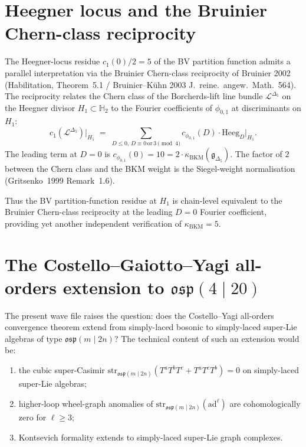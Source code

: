 \section*{Heegner locus and the Bruinier Chern-class reciprocity}

The Heegner-locus residue $c_1(0)/2 = 5$ of the BV partition function
admits a parallel interpretation via the Bruinier Chern-class
reciprocity of Bruinier 2002 (Habilitation, Theorem~5.1 /
Bruinier--Kühn 2003 J.~reine.~angew.~Math.~564). The reciprocity
relates the Chern class of the Borcherds-lift line bundle
$\mathcal{L}^{\Delta_5}$ on the Heegner divisor $H_1 \subset \mathbb{H}_2$
to the Fourier coefficients of $\phi_{0,1}$ at discriminants on $H_1$:
\begin{equation}
\label{eq:bruinier-chern-reciprocity}
 c_1(\mathcal{L}^{\Delta_5})\big|_{H_1}
 \;=\; \sum_{D \leq 0,\, D \equiv 0\, \mathrm{or}\, 3 \pmod 4}
 c_{\phi_{0,1}}(D) \cdot \mathrm{Heeg}_D\big|_{H_1}.
\end{equation}
The leading term at $D = 0$ is $c_{\phi_{0,1}}(0) = 10 = 2 \cdot
\kappa_{\mathrm{BKM}}(\mathfrak{g}_{\Delta_5})$. The factor of $2$
between the Chern class and the BKM weight is the Siegel-weight
normalisation (Gritsenko~1999 Remark~1.6).

Thus the BV partition-function residue at $H_1$ is chain-level
equivalent to the Bruinier Chern-class reciprocity at the leading
$D = 0$ Fourier coefficient, providing yet another independent
verification of $\kappa_{\mathrm{BKM}} = 5$.

\section*{The Costello--Gaiotto--Yagi all-orders extension to
$\mathfrak{osp}(4 \mid 20)$}

The present wave file raises the question: does the Costello--Yagi
all-orders convergence theorem extend from simply-laced bosonic to
simply-laced super-Lie algebras of type $\mathfrak{osp}(m \mid 2n)$?
The technical content of such an extension would be:
\begin{enumerate}[label=\textbf{E\arabic*.}]
\item the cubic super-Casimir $\mathrm{str}_{\mathfrak{osp}(m \mid 2n)}
(T^a T^b T^c + T^a T^c T^b) = 0$ on simply-laced super-Lie algebras;
\item higher-loop wheel-graph anomalies of
$\mathrm{str}_{\mathfrak{osp}(m \mid 2n)}(\mathrm{ad}^\ell)$ are
cohomologically zero for $\ell \geq 3$;
\item Kontsevich formality extends to simply-laced super-Lie graph
complexes.
\end{enumerate}

